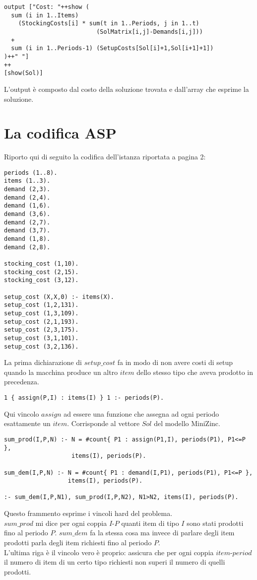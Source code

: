 \documentclass[12pt]{article}
\begin{document}
\begin{verbatim}
output ["Cost: "++show (
  sum (i in 1..Items)
    (StockingCosts[i] * sum(t in 1..Periods, j in 1..t)
                          (SolMatrix[i,j]-Demands[i,j]))
  +
  sum (i in 1..Periods-1) (SetupCosts[Sol[i]+1,Sol[i+1]+1])
)++" "]
++
[show(Sol)]
\end{verbatim}
L'output è composto dal costo della soluzione trovata e dall'array che esprime la soluzione.
\pagebreak

\section*{La codifica ASP}
Riporto qui di seguito la codifica dell'istanza riportata a pagina 2:
\begin{verbatim}
periods (1..8).
items (1..3).
demand (2,3).
demand (2,4).
demand (1,6).
demand (3,6).
demand (2,7).
demand (3,7).
demand (1,8).
demand (2,8).

stocking_cost (1,10).
stocking_cost (2,15).
stocking_cost (3,12).

setup_cost (X,X,0) :- items(X).
setup_cost (1,2,131).
setup_cost (1,3,109).
setup_cost (2,1,193).
setup_cost (2,3,175).
setup_cost (3,1,101).
setup_cost (3,2,136).
\end{verbatim}
La prima dichiarazione di $setup\_cost$ fa in modo di non avere costi di setup quando la macchina produce un altro $item$ dello stesso tipo che aveva prodotto in precedenza.

\begin{verbatim}
1 { assign(P,I) : items(I) } 1 :- periods(P).
\end{verbatim}
Qui vincolo $assign$ ad essere una funzione che assegna ad ogni periodo esattamente un $item$. Corrisponde al vettore $Sol$ del modello MiniZinc.
\pagebreak

\begin{verbatim}
sum_prod(I,P,N) :- N = #count{ P1 : assign(P1,I), periods(P1), P1<=P },
                   items(I), periods(P).

sum_dem(I,P,N) :- N = #count{ P1 : demand(I,P1), periods(P1), P1<=P },
                  items(I), periods(P).

:- sum_dem(I,P,N1), sum_prod(I,P,N2), N1>N2, items(I), periods(P).
\end{verbatim}
Questo frammento esprime i vincoli hard del problema.\\
$sum\_prod$ mi dice per ogni coppia $I$-$P$ quanti item di tipo $I$ sono stati prodotti fino al periodo $P$. $sum\_dem$ fa la stessa cosa ma invece di parlare degli item prodotti parla degli item richiesti fino al periodo $P$.\\
L'ultima riga è il vincolo vero è proprio: assicura che per ogni coppia $item$-$period$ il numero di item di un certo tipo richiesti non superi il numero di quelli prodotti.
\end{document}
